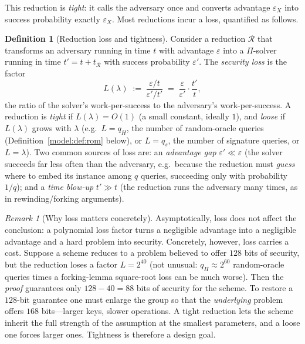 \documentclass[11pt,a4paper]{article}
\theoremstyle{definition}
\newtheorem{definition}[theorem]{Definition}
\theoremstyle{remark}
\newtheorem{remark}[theorem]{Remark}
\begin{document}
This reduction is \emph{tight}: it calls the adversary once and
converts advantage \(\varepsilon_X\) into success probability exactly
\(\varepsilon_X\). Most reductions incur a loss, quantified as
follows.

\begin{definition}[Reduction loss and tightness]\label{model:def:tightness}
Consider a reduction \(\mathcal{R}\) that transforms an adversary
running in time \(t\) with advantage \(\varepsilon\) into a
\(\Pi\)-solver running in time \(t' = t + t_{\mathcal{R}}\) with
success probability \(\varepsilon'\). The \emph{security loss} is the
factor
\[
  L(\lambda) \;:=\; \frac{\varepsilon / t}{\varepsilon' / t'}
  \;=\; \frac{\varepsilon}{\varepsilon'}\cdot\frac{t'}{t},
\]
the ratio of the solver's work-per-success to the adversary's
work-per-success. A reduction is \emph{tight} if
\(L(\lambda) = O(1)\) (a small constant, ideally \(1\)), and
\emph{loose} if \(L(\lambda)\) grows with \(\lambda\) (e.g.\
\(L = q_H\), the number of random-oracle queries
(Definition~\ref{model:def:rom} below), or \(L = q_s\), the number of
signature queries, or \(L = \lambda\)). Two common sources
of loss are: an \emph{advantage gap} \(\varepsilon' \ll \varepsilon\)
(the solver succeeds far less often than the adversary, e.g.\ because
the reduction must \emph{guess} where to embed its instance among
\(q\) queries, succeeding only with probability \(1/q\)); and a
\emph{time blow-up} \(t' \gg t\) (the reduction runs the adversary
many times, as in rewinding/forking arguments).
\end{definition}

\begin{remark}[Why loss matters concretely]\label{model:rem:loss-matters}
Asymptotically, loss does not affect the conclusion: a polynomial
loss factor turns a negligible advantage into a negligible advantage
and a hard problem into security. Concretely, however, loss carries a
cost. Suppose a scheme reduces to a problem
believed to offer \(128\) bits of security, but the reduction loses a factor
\(L = 2^{40}\) (not unusual: \(q_H \approx 2^{60}\) random-oracle
queries times a forking-lemma square-root loss can be much worse).
Then the \emph{proof} guarantees only \(128 - 40 = 88\) bits of
security for the scheme. To restore a \(128\)-bit guarantee one must
enlarge the group so that the \emph{underlying} problem offers
\(168\) bits---larger keys, slower operations. A tight reduction lets
the scheme inherit the full strength of the assumption at the smallest
parameters, and a loose one forces larger ones. Tightness is therefore a
design goal.
\end{remark}
\end{document}
